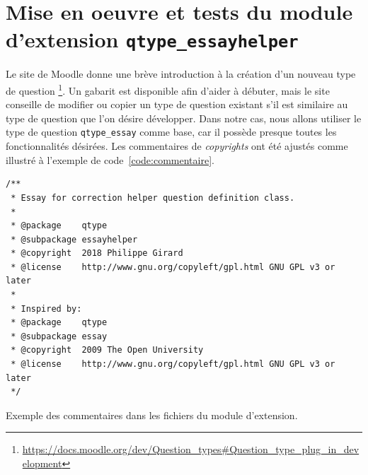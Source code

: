 \chapter{Mise en oeuvre et tests du module d'extension \texttt{qtype\_essayhelper}}
Le site de Moodle donne une br\`eve introduction \`a la cr\'eation d'un nouveau type de question \footnote{\url{https://docs.moodle.org/dev/Question\_types\#Question\_type\_plug\_in\_development}}.
Un gabarit est disponible afin d'aider \`a d\'ebuter, mais le site conseille de modifier ou copier un type de question existant s'il est similaire au type de question que l'on d\'esire d\'evelopper.
Dans notre cas, nous allons utiliser le type de question \texttt{qtype\_essay} comme base, car il poss\`ede presque toutes les fonctionnalit\'es d\'esir\'ees.
Les commentaires de \emph{copyrights} ont \'et\'e ajust\'es comme illustr\'e \`a l'exemple de code~\ref{code:commentaire}.
\begin{lstfloat}
\begin{lstlisting}[frame=l]
/**
 * Essay for correction helper question definition class.
 *
 * @package    qtype
 * @subpackage essayhelper
 * @copyright  2018 Philippe Girard
 * @license    http://www.gnu.org/copyleft/gpl.html GNU GPL v3 or later
 *
 * Inspired by:
 * @package    qtype
 * @subpackage essay
 * @copyright  2009 The Open University
 * @license    http://www.gnu.org/copyleft/gpl.html GNU GPL v3 or later
 */
\end{lstlisting}
\caption{Exemple des commentaires dans les fichiers du module d'extension.}
\label{code:commentaire}
\end{lstfloat}
